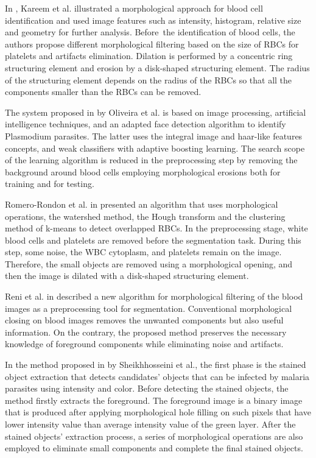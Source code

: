 \documentclass[final,a4paper,12pt,english]{UnicaPhdThesis3}
\begin{document}
In \cite{Kareem2012}, Kareem et al. illustrated a morphological approach for blood cell identification and used image features such as intensity, histogram, relative size and geometry for further analysis. Before~the identification of blood cells, the authors propose different morphological filtering based on the size of RBCs for platelets and artifacts elimination. Dilation is performed by a concentric ring structuring element and erosion by a disk-shaped structuring element. The radius of the structuring element depends on the radius of the RBCs so that all the components smaller than the RBCs can be removed.

The system proposed in \cite{Oliveira2017} by Oliveira et al. is based on image processing, artificial intelligence techniques, and an adapted face detection algorithm to identify Plasmodium parasites. The latter uses the integral image and haar-like features concepts, and weak classifiers with adaptive boosting learning. The search scope of the learning algorithm is reduced in the preprocessing step by removing the background around blood cells employing morphological erosions both for training and for testing.

Romero-Rondon et al. in \cite{Romero2016} presented an algorithm that uses morphological operations, the watershed method, the Hough transform and the clustering method of k-means to detect overlapped RBCs. In the preprocessing stage, white blood cells and platelets are removed before the segmentation task. During this step, some noise, the WBC cytoplasm, and platelets remain on the image. 
Therefore, the small objects are removed using a morphological opening, and then the image is dilated with a disk-shaped structuring element.

Reni et al. in \cite{Reni2015} described a new algorithm for morphological filtering of the blood images as a preprocessing tool for segmentation. Conventional morphological closing on blood images removes the unwanted components but also useful information. On the contrary, the proposed method preserves the necessary knowledge of foreground components while eliminating noise and artifacts.

In the method proposed in \cite{Sheik2013} by Sheikhhosseini et al., the first phase is the stained object extraction that detects candidates' objects that can be infected by malaria parasites using intensity and color. Before detecting the stained objects, the method firstly extracts the foreground. The foreground image is a binary image that is produced after applying morphological hole filling on such pixels that have lower intensity value than average intensity value of the green layer. After the stained objects' extraction process, a series of morphological operations are also employed to eliminate small components and complete the final stained objects.
\end{document}
